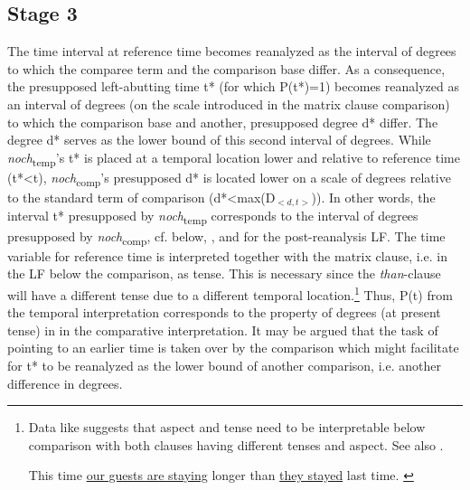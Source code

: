 \documentclass[output=paper
,modfonts
,nonflat]{langsci/langscibook}
\begin{document}
\subsection{Stage 3} The time interval at reference time becomes reanalyzed as the interval of degrees to which the comparee term and the comparison base differ. As a consequence, the presupposed left-abutting time t* (for which P(t*)=1) becomes reanalyzed as an interval of degrees (on the scale introduced in the matrix clause comparison) to which the comparison base and another, presupposed degree d* differ. The degree d* serves as the lower bound of this second interval of degrees. While \textit{noch}\textsubscript{temp}'s t* is placed at a temporal location lower and relative to reference time (t*<t), \textit{noch}\textsubscript{comp}'s presupposed d* is located lower on a scale of degrees relative to the standard term of comparison (d*<max(D$_{<d,t>}$)). In other words, the interval t* presupposed by \textit{noch}\textsubscript{temp} corresponds to the interval of degrees presupposed by \textit{noch}\textsubscript{comp}, cf. below, , and  for the post-reanalysis LF. The time variable for reference time is interpreted together with the matrix clause, i.e. in the LF below the comparison, as tense. This is necessary since the \textit{than}-clause will have a different tense due to a different temporal location.\footnote{Data like  suggests that aspect and tense need to be interpretable below comparison with both clauses having different tenses and aspect. See also \citep{stechow2006}.

\ea This time \underline{our guests are staying} longer than \underline{they stayed} last time. \label{tense_and_aspect_example}\z} Thus, P(t) from the temporal interpretation corresponds to the property of degrees (at present tense) in  in the comparative interpretation. 
It may be argued that the task of pointing to an earlier time is taken over by the comparison which might facilitate for t* to be reanalyzed as the lower bound of another comparison, i.e. another difference in degrees. 
\end{document}
